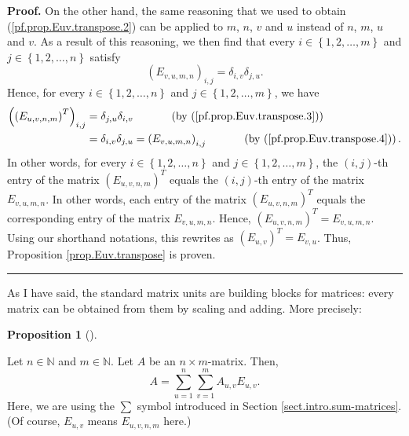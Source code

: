 \documentclass[numbers=enddot,12pt,final,onecolumn,notitlepage]{scrartcl}%
\theoremstyle{definition}
\newtheorem{prop}[theo]{Proposition}
\newenvironment{proposition}[1][]
{\begin{prop}[#1]\begin{leftbar}}
{\end{leftbar}\end{prop}}
\newenvironment{proof}[1][Proof]{\noindent\textbf{#1.} }{\ \rule{0.5em}{0.5em}}
\let\sumnonlimits\sum
\renewcommand{\sum}{\sumnonlimits\limits}
\begin{document}
\begin{proof}
On the other hand, the same reasoning that we used to obtain
(\ref{pf.prop.Euv.transpose.2}) can be applied to $m$, $n$, $v$ and $u$
instead of $n$, $m$, $u$ and $v$. As a result of this reasoning, we then find
that every $i\in\left\{  1,2,\ldots,m\right\}  $ and $j\in\left\{
1,2,\ldots,n\right\}  $ satisfy%
\begin{equation}
\left(  E_{v,u,m,n}\right)  _{i,j}=\delta_{i,v}\delta_{j,u}.
\label{pf.prop.Euv.transpose.4}%
\end{equation}
Hence, for every $i\in\left\{  1,2,\ldots,n\right\}  $ and $j\in\left\{
1,2,\ldots,m\right\}  $, we have%
\begin{align*}
\left(  \left(  E_{u,v,n,m}\right)  ^{T}\right)  _{i,j}  &  =\delta
_{j,u}\delta_{i,v}\ \ \ \ \ \ \ \ \ \ \left(  \text{by
(\ref{pf.prop.Euv.transpose.3})}\right) \\
&  =\delta_{i,v}\delta_{j,u}=\left(  E_{v,u,m,n}\right)  _{i,j}%
\ \ \ \ \ \ \ \ \ \ \left(  \text{by (\ref{pf.prop.Euv.transpose.4})}\right)
.
\end{align*}
In other words, for every $i\in\left\{  1,2,\ldots,n\right\}  $ and
$j\in\left\{  1,2,\ldots,m\right\}  $, the $\left(  i,j\right)  $-th entry of
the matrix $\left(  E_{u,v,n,m}\right)  ^{T}$ equals the $\left(  i,j\right)
$-th entry of the matrix $E_{v,u,m,n}$. In other words, each entry of the
matrix $\left(  E_{u,v,n,m}\right)  ^{T}$ equals the corresponding entry of
the matrix $E_{v,u,m,n}$. Hence, $\left(  E_{u,v,n,m}\right)  ^{T}%
=E_{v,u,m,n}$. Using our shorthand notations, this rewrites as $\left(
E_{u,v}\right)  ^{T}=E_{v,u}$. Thus, Proposition \ref{prop.Euv.transpose} is proven.
\end{proof}

As I have said, the standard matrix units are building blocks for matrices:
every matrix can be obtained from them by scaling and adding. More precisely:

\begin{proposition}
\label{prop.Euv.A=sum}Let $n\in\mathbb{N}$ and $m\in\mathbb{N}$. Let $A$ be an
$n\times m$-matrix. Then,%
\[
A=\sum_{u=1}^{n}\sum_{v=1}^{m}A_{u,v}E_{u,v}.
\]
Here, we are using the $\sum$ symbol introduced in Section
\ref{sect.intro.sum-matrices}. (Of course, $E_{u,v}$ means $E_{u,v,n,m}$ here.)
\end{proposition}
\end{document}
